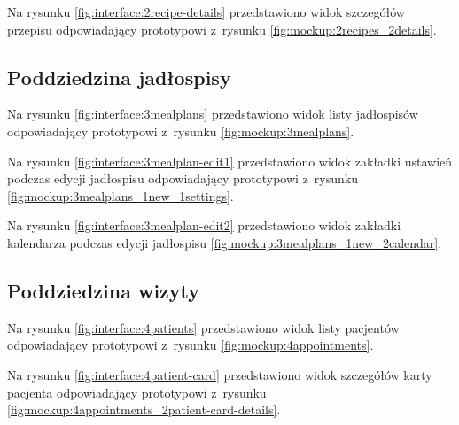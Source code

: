 
Na rysunku \ref{fig:interface:2recipe-details} przedstawiono widok szczegółów przepisu odpowiadający prototypowi z~rysunku \ref{fig:mockup:2recipes_2details}.


\subsection{Poddziedzina jadłospisy}

Na rysunku \ref{fig:interface:3mealplans} przedstawiono widok listy jadłospisów odpowiadający prototypowi z~rysunku \ref{fig:mockup:3mealplans}.


Na rysunku \ref{fig:interface:3mealplan-edit1} przedstawiono widok zakładki ustawień podczas edycji jadłospisu odpowiadający prototypowi z~rysunku \ref{fig:mockup:3mealplans_1new_1settings}.


Na rysunku \ref{fig:interface:3mealplan-edit2} przedstawiono widok zakładki kalendarza podczas edycji jadłospisu \ref{fig:mockup:3mealplans_1new_2calendar}.



\subsection{Poddziedzina wizyty}

Na rysunku \ref{fig:interface:4patients} przedstawiono widok listy pacjentów odpowiadający prototypowi z~rysunku \ref{fig:mockup:4appointments}.



Na rysunku \ref{fig:interface:4patient-card} przedstawiono widok szczegółów karty pacjenta odpowiadający prototypowi z~rysunku \ref{fig:mockup:4appointments_2patient-card-details}.


